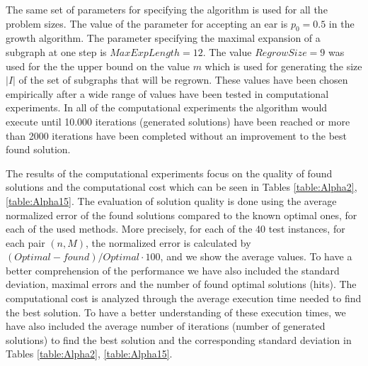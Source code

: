 The same set of parameters for specifying the algorithm is used for all the problem sizes. The value of the parameter for accepting an ear is $p_0 = 0.5$ in the growth algorithm.  The parameter specifying the maximal expansion of a subgraph  at one step is $MaxExpLength = 12$.  The value $RegrowSize = 9$ was used for the the upper bound on the value $m$ which is used for generating the size $|I|$ of the set of subgraphs that will be regrown. These values have been chosen empirically after a wide range of values have been tested in computational experiments. In all of the computational experiments the algorithm would execute until  10.000 iterations (generated solutions) have been reached  or  more than 2000 iterations have been completed without an improvement to the best found solution. 

The results of the computational experiments focus on the quality of found solutions and the computational cost which can be seen in Tables \ref{table:Alpha2}, \ref{table:Alpha15}. The evaluation of solution quality is done using the  average normalized error of the found solutions compared to the known optimal ones, for each of the used methods. More precisely, for each of the 40 test instances, for each pair $(n,M)$,  the normalized error is calculated by $(Optimal - found)/Optimal \cdot 100$, and we show the average values.  To have a better comprehension of the performance we have also included the standard deviation, maximal errors and the number of found optimal solutions (hits).  The computational cost is analyzed through  the average execution time  needed to find the best solution. To have a better understanding of these execution times,  we have also included the average number of iterations (number of generated solutions) to find the best solution and the corresponding standard deviation in Tables \ref{table:Alpha2}, \ref{table:Alpha15}.


